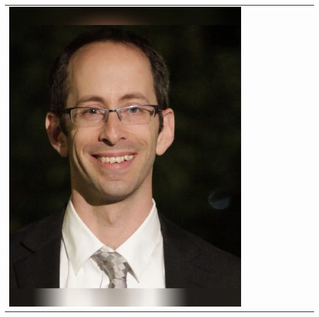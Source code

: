 \documentclass[landscape,a0paper,fontscale=0.292]{baposter}
\begin{document}
\begin{poster}
{\begin{center}
\begin{tabularx}{\linewidth}{X X X X X X X X X}
{\centering \includegraphics[width=0.65\linewidth]{rosman.jpg}}\\ 


\end{tabularx}
\end{center}}
\end{poster}
\end{document}

